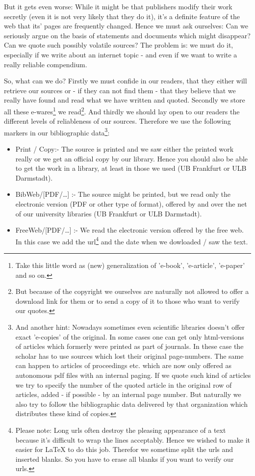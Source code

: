But it gets even worse: While it might be that publishers modify their work
secretly (even it is not very likely that they do it), it's a definite feature
of the web that its' pages are fre\-quen\-tly changed. Hence we must ask
ourselves: Can we seriously argue on the basis of statements and documents which
might disappear? Can we quote such possibly volatile sources? The problem is: we
must do it, especially if we write about an internet topic - and even if we want
to write a really reliable compendium.

So, what can we do? Firstly we must confide in our readers, that they either
will retrieve our sources or - if they can not find them - that they
believe that we really have found and read what we have written and
quoted. Secondly we store all these e-wares\footnote{Take this little word as
(new) generalization of 'e-book', 'e-article', 'e-paper' and so on.} we
read\footnote{But because of the copyright we ourselves are naturally not
allowed to offer a download link for them or to send a copy of it to those who
want to verify our quotes.}. And thirdly we should lay open to our readers the
different levels of reliableness of our sources. Therefore we use the following
markers in our bibliographic data\footnote{And another hint: Nowadays sometimes
even scientific libraries doesn't offer exact 'e-copies' of the original. In
some cases one can get only html-versions of articles which formerly were
printed as part of journals. In these case the scholar has to use sources which
lost their original page-numbers. The same can happen to articles of proceedings
etc. which are now only offered as autonomous pdf files with an internal paging.
If we quote such kind of articles we try to specify the number of the quoted
article in the original row of articles, added - if possible - by an internal
page number. But naturally we also try to follow the bibliographic data
delivered by that organization which distributes these kind of copies.}:

\begin{itemize}
	\item Print / Copy:- The source is printed and we saw either the printed work
	really or we get an official copy by our library. Hence you should also be able
	to get the work in a library, at least in those we used (UB Frankfurt or ULB
	Darmstadt).
	\item BibWeb/[PDF/\ldots] :- The source might be printed, but we read only the
	electronic version (PDF or other type of format), offered by and over the
	net of our university libraries (UB Frankfurt or ULB Darmstadt).
  \item FreeWeb/[PDF/\ldots] :- We read the electronic version offered by the
  free web. In this case we add the url\footnote{Please note: Long urls often
  destroy the pleasing appearance of a text because it's difficult to wrap the
  lines acceptably. Hence we wished to make it easier for LaTeX to do this job.
  Therefor we sometime split the urls and inserted blanks. So you have to erase
  all blanks if you want to verify our urls.} and the date when we dowloaded /
  saw the text.
\end{itemize}
